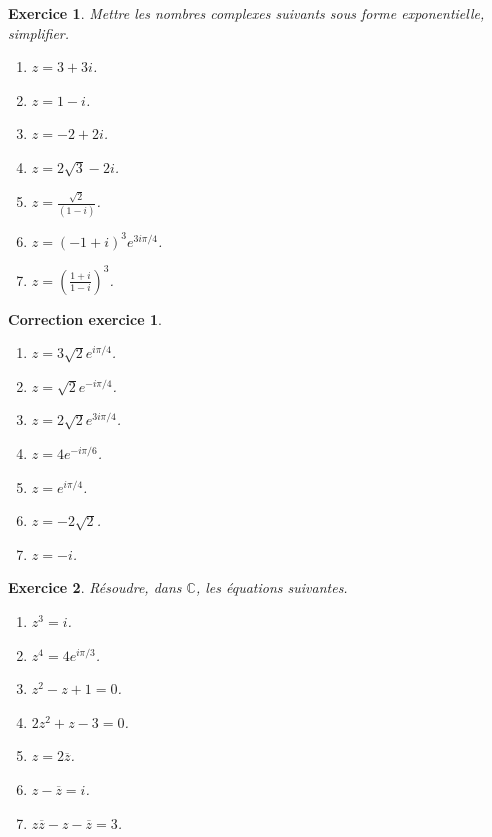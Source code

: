 \documentclass[12pt]{article}
\newtheorem{exercice}{\bf Exercice}
\newtheorem{correction}{\bf Correction exercice}
\newenvironment{exo}{
\begin{exercice}\smallskip\normalfont}{\end{exercice}
}
\newenvironment{cor}{
\begin{correction}\smallskip\normalfont}{\end{correction}
}
\newif\ifcorrige\corrigetrue
\begin{document}
 
 
\begin{exo} Mettre les nombres complexes suivants sous forme exponentielle, simplifier.
 \begin{enumerate}
  \item $z=3+3i$. 
  \item $z=1-i$.
  \item  $z=-2+2i$.
  \item  $z=2\sqrt{3}-2i$.
  \item $z=\frac{\sqrt{2}}{(1-i)}$.
  \item $z=(-1+i)^3e^{3i\pi/4}$.
  \item $z=\left( \frac{1+i}{1-i} \right)^3$.
 \end{enumerate}
 \end{exo}
 
  \ifcorrige
\color{magenta}
\begin{cor}
  $\qquad$
\begin{enumerate}
\item $z=3\sqrt{2}e^{i\pi/4}$.
\item $z=\sqrt{2}e^{-i\pi/4}$.
\item $z=2\sqrt{2}e^{3i\pi/4}$.
\item $z=4e^{-i\pi/6}$.
\item $z=e^{i\pi/4}$.
\item $z=-2\sqrt{2}$.
\item $z=-i$.
\end{enumerate}
\end{cor}
\color{black}
\fi

 
 
\begin{exo}
 R\'esoudre, dans  $\mathbb{C}$, les \'equations suivantes.
 \begin{enumerate}
  \item $z^3=i$.
  \item $z^4=4e^{i\pi/3}$.
  \item $z^2-z+1=0$.
  \item $2z^2+z-3=0$.
  \item $z=2\overline{z}$.
  \item $z-\overline{z}=i$.
  \item $z\overline{z}-z-\overline{z}=3$.
 \end{enumerate}
 \end{exo}
 
\end{document}
